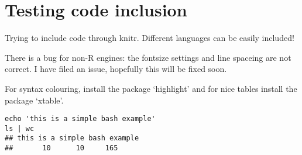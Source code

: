 \documentclass[output=inprep,
		biblatex
		]{LSP/langsci}\usepackage[]{graphicx}\usepackage[]{color}
\makeatletter
\newenvironment{kframe}{%
 \def\at@end@of@kframe{}%
 \ifinner\ifhmode%
  \def\at@end@of@kframe{\end{minipage}}%
  \begin{minipage}{\columnwidth}%
 \fi\fi%
 \def\FrameCommand##1{\hskip\@totalleftmargin \hskip-\fboxsep
 \colorbox{shadecolor}{##1}\hskip-\fboxsep
     \hskip-\linewidth \hskip-\@totalleftmargin \hskip\columnwidth}%
 \MakeFramed {\advance\hsize-\width
   \@totalleftmargin\z@ \linewidth\hsize
   \@setminipage}}%
 {\par\unskip\endMakeFramed%
 \at@end@of@kframe}
\newenvironment{knitrout}{}{} %
\makeatother
\begin{document}
\maketitle
\frontmatter
% 
% 
% 
\tableofcontents
\mainmatter%














\chapter{Testing code inclusion}


Trying to include code through knitr. 
Different languages can be easily 
included!

There is a bug for non-R engines: the fontsize settings and line spaceing are not correct. I have 
filed an issue, hopefully this will be fixed soon. 

For syntax colouring, install the package `highlight' and for nice tables 
install the package `xtable'.

\begin{knitrout}\scriptsize
{}\color{fgcolor}\begin{kframe}
\begin{verbatim}
echo 'this is a simple bash example'
ls | wc
## this is a simple bash example
##       10      10     165
\end{verbatim}
\end{kframe}
\end{knitrout}
\end{document}

